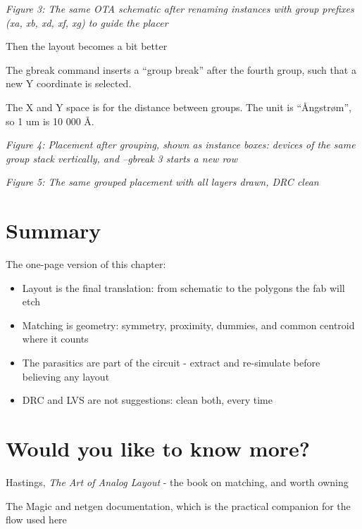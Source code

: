 \emph{Figure 3: The same OTA schematic after renaming instances with
group prefixes (xa, xb, xd, xf, xg) to guide the placer}

Then the layout becomes a bit better

\begin{Shaded}
\begin{Highlighting}[]
\end{Highlighting}
\end{Shaded}

The gbreak command inserts a ``group break'' after the fourth group,
such that a new Y coordinate is selected.

The X and Y space is for the distance between groups. The unit is
``Ångstrøm'', so 1 um is 10 000 Å.


{
\centering
{}
}

\emph{Figure 4: Placement after grouping, shown as instance boxes:
devices of the same group stack vertically, and --gbreak 3 starts a new
row}


{
\centering
{}
}

\emph{Figure 5: The same grouped placement with all layers drawn, DRC
clean}

\section{Summary}\label{summary}

The one-page version of this chapter:

\begin{itemize}
\tightlist
\item
  Layout is the final translation: from schematic to the polygons the
  fab will etch
\item
  Matching is geometry: symmetry, proximity, dummies, and common
  centroid where it counts
\item
  The parasitics are part of the circuit - extract and re-simulate
  before believing any layout
\item
  DRC and LVS are not suggestions: clean both, every time
\end{itemize}

\section{Would you like to know
more?}\label{would-you-like-to-know-more}

Hastings, \emph{The Art of Analog Layout} - the book on matching, and
worth owning

The Magic and netgen documentation, which is the practical companion for
the flow used here
